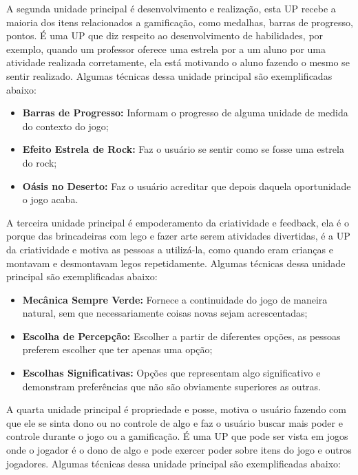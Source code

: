 A segunda unidade principal é desenvolvimento e realização, esta UP recebe a maioria dos itens relacionados a gamificação, como medalhas, barras de progresso, pontos. É uma UP que diz respeito ao desenvolvimento de habilidades, por exemplo, quando um professor oferece uma estrela por a um aluno por uma atividade realizada corretamente, ela está motivando o aluno fazendo o mesmo se sentir realizado. Algumas técnicas dessa unidade principal são exemplificadas abaixo:

\begin{itemize}
\item  \textbf{Barras de Progresso:} Informam o progresso de alguma unidade de medida do contexto do jogo;
\item  \textbf{Efeito Estrela de Rock:} Faz o usuário se sentir como se fosse uma estrela do rock;
\item  \textbf{Oásis no Deserto:} Faz o usuário acreditar que depois daquela oportunidade o jogo acaba.
\end{itemize}

A terceira unidade principal é empoderamento da criatividade e feedback, ela é o porque das brincadeiras com lego e fazer arte serem atividades divertidas, é a UP da criatividade e motiva as pessoas a utilizá-la, como quando eram crianças e montavam e desmontavam legos repetidamente. Algumas técnicas dessa unidade principal são exemplificadas abaixo:

\begin{itemize}
\item  \textbf{Mecânica Sempre Verde:} Fornece a continuidade do jogo de maneira natural, sem que necessariamente coisas novas sejam acrescentadas;
\item  \textbf{Escolha de Percepção:} Escolher a partir de diferentes opções, as pessoas preferem escolher que ter apenas uma opção;
\item  \textbf{Escolhas Significativas:} Opções que representam algo significativo e demonstram preferências que não são obviamente superiores as outras.
\end{itemize}

A quarta unidade principal é propriedade e posse, motiva o usuário fazendo com que ele se sinta dono ou no controle de algo e faz o usuário buscar mais poder e controle durante o jogo ou a gamificação. É uma UP que pode ser vista em jogos onde o jogador é o dono de algo e pode exercer poder sobre itens do jogo e outros jogadores. Algumas técnicas dessa unidade principal são exemplificadas abaixo:

